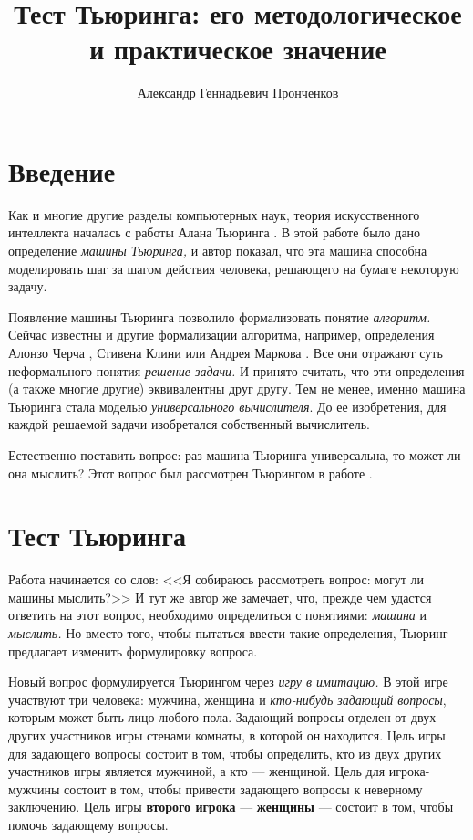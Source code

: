\documentclass[a4paper,14pt]{scrartcl}
\begin{document}
\title{Тест Тьюринга: его методологическое и практическое значение}
\author{Александр Геннадьевич Пронченков}


\tableofcontents

\thispagestyle{empty}

\pagebreak

\section{Введение}

Как и многие другие разделы компьютерных наук, теория искусственного интеллекта началась с работы Алана Тьюринга \cite{turing_1936}. В этой работе было дано определение {\it машины Тьюринга,} и автор показал, что эта машина способна моделировать шаг за шагом действия человека, решающего на бумаге некоторую задачу.

Появление машины Тьюринга позволило формализовать понятие {\it алгоритм.} Сейчас известны и другие формализации алгоритма, например, определения Алонзо Черча \cite{church_1932}, Стивена Клини \cite{kleene_1936} или Андрея Маркова \cite{markov_1984}. Все они отражают суть неформального понятия {\it решение задачи.} И принято считать, что эти определения (а также многие другие) эквивалентны друг другу. Тем не менее, именно машина Тьюринга стала моделью {\it универсального вычислителя}. До ее изобретения, для каждой решаемой задачи изобретался собственный вычислитель.

Естественно поставить вопрос: раз машина Тьюринга универсальна, то может ли она мыслить? Этот вопрос был рассмотрен Тьюрингом в работе \cite{turing_1950}.

\section{Тест Тьюринга}

Работа \cite{turing_1950} начинается со слов: <<Я собираюсь рассмотреть вопрос: могут ли машины мыслить?>> И тут же автор же замечает, что, прежде чем удастся ответить на этот вопрос, необходимо определиться с понятиями: {\it машина} и {\it мыслить.} Но вместо того, чтобы пытаться ввести такие определения, Тьюринг предлагает изменить формулировку вопроса.

Новый вопрос формулируется Тьюрингом через {\it игру в имитацию.} В этой игре участвуют три человека: мужчина, женщина и {\it кто-нибудь задающий вопросы}, которым может быть лицо любого пола. Задающий вопросы отделен от двух других участников игры стенами комнаты, в которой он находится. Цель игры для задающего вопросы состоит в том, чтобы определить, кто из двух других участников игры является мужчиной, а кто — женщиной. Цель для игрока-мужчины состоит в том, чтобы привести задающего вопросы к неверному заключению. Цель игры {\bf второго игрока} — {\bf женщины} — состоит в том, чтобы помочь задающему вопросы.
\end{document}
